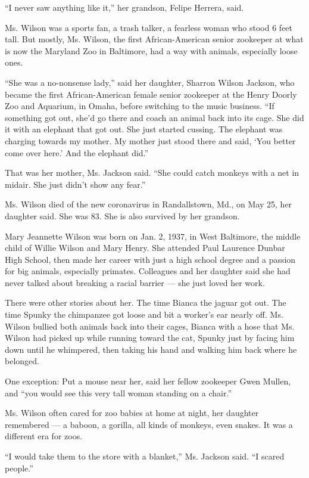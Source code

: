 ``I never saw anything like it,'' her grandson, Felipe Herrera, said.

Ms. Wilson was a sports fan, a trash talker, a fearless woman who stood
6 feet tall. But mostly, Ms. Wilson, the first African-American senior
zookeeper at what is now the Maryland Zoo in Baltimore, had a way with
animals, especially loose ones.

``She was a no-nonsense lady,'' said her daughter, Sharron Wilson
Jackson, who became the first African-American female senior zookeeper
at the Henry Doorly Zoo and Aquarium, in Omaha, before switching to the
music business. ``If something got out, she'd go there and coach an
animal back into its cage. She did it with an elephant that got out. She
just started cussing. The elephant was charging towards my mother. My
mother just stood there and said, `You better come over here.' And the
elephant did.''

That was her mother, Ms. Jackson said. ``She could catch monkeys with a
net in midair. She just didn't show any fear.''

Ms. Wilson died of the new coronavirus in Randallstown, Md., on May 25,
her daughter said. She was 83. She is also survived by her grandson.

Mary Jeannette Wilson was born on Jan. 2, 1937, in West Baltimore, the
middle child of Willie Wilson and Mary Henry. She attended Paul Laurence
Dunbar High School, then made her career with just a high school degree
and a passion for big animals, especially primates. Colleagues and her
daughter said she had never talked about breaking a racial barrier ---
she just loved her work.

There were other stories about her. The time Bianca the jaguar got out.
The time Spunky the chimpanzee got loose and bit a worker's ear nearly
off. Ms. Wilson bullied both animals back into their cages, Bianca with
a hose that Ms. Wilson had picked up while running toward the cat,
Spunky just by facing him down until he whimpered, then taking his hand
and walking him back where he belonged.

One exception: Put a mouse near her, said her fellow zookeeper Gwen
Mullen, and ``you would see this very tall woman standing on a chair.''

Ms. Wilson often cared for zoo babies at home at night, her daughter
remembered --- a baboon, a gorilla, all kinds of monkeys, even snakes.
It was a different era for zoos.

``I would take them to the store with a blanket,'' Ms. Jackson said. ``I
scared people.''

